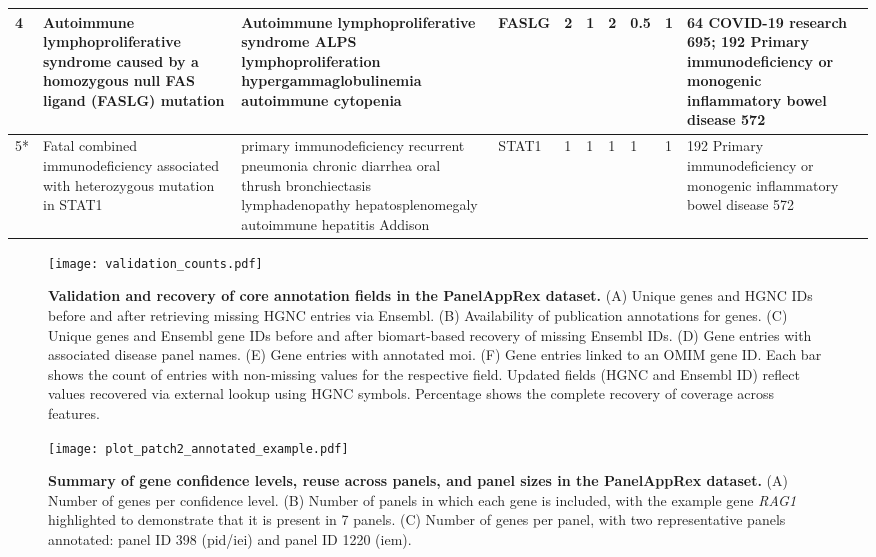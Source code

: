 \begin{table}[htbp]
{\begin{tabular}{|
    p{1cm}|
    p{4cm}|
    p{4cm}|
    p{1.4cm}|
    p{1.3cm}|
    p{1.3cm}|
    p{1.3cm}|
    p{1.3cm}|
    p{1.3cm}|
    p{5cm}|}
\hline																			
4	\cite{magerus-chatinet_autoimmune_2013}	 & 	Autoimmune lymphoproliferative syndrome caused by a homozygous null FAS ligand (FASLG) mutation	 & 	Autoimmune lymphoproliferative syndrome ALPS lymphoproliferation hypergammaglobulinemia autoimmune cytopenia	 & 	FASLG	 & 	2	 & 	1	 & 	2	 & 	0.5	 & 	1	 & 	64 COVID-19 research 695; 192 Primary immunodeficiency or monogenic inflammatory bowel disease 572 \\
\hline																			
5*	\cite{sharfe_fatal_2014}	 & 	Fatal combined immunodeficiency associated with heterozygous mutation in STAT1	 & 	primary immunodeficiency recurrent pneumonia chronic diarrhea oral thrush bronchiectasis lymphadenopathy hepatosplenomegaly autoimmune hepatitis Addison	 & 	STAT1	 & 	1	 & 	1	 & 	1	 & 	1	 & 	1	 & 	192 Primary immunodeficiency or monogenic inflammatory bowel disease 572 \\
\hline
\end{tabular}
}
\end{table}





\begin{figure}[ht]
    \centering
    \texttt{[image: validation\_counts.pdf]}
\caption{\textbf{Validation and recovery of core annotation fields in the PanelAppRex dataset.}
(A) Unique genes and HGNC IDs before and after retrieving missing HGNC entries via Ensembl.
(B) Availability of publication annotations for genes.
(C) Unique genes and Ensembl gene IDs before and after biomart-based recovery of missing Ensembl IDs.
(D) Gene entries with associated disease panel names.
(E) Gene entries with annotated \ac{moi}.
(F) Gene entries linked to an OMIM gene ID.
Each bar shows the count of entries with non-missing values for the respective field. Updated fields (HGNC and Ensembl ID) reflect values recovered via external lookup using HGNC symbols. Percentage shows the complete recovery of coverage across features.
}
    \label{fig:validation}
\end{figure}

\begin{figure}[ht]
    \centering
    \texttt{[image: plot\_patch2\_annotated\_example.pdf]}    
\caption{\textbf{Summary of gene confidence levels, reuse across panels, and panel sizes in the PanelAppRex dataset.}
(A) Number of genes per confidence level. 
(B) Number of panels in which each gene is included, with the example gene \textit{RAG1} highlighted to demonstrate that it is present in 7 panels. 
(C) Number of genes per panel, with two representative panels annotated: panel ID 398 (\ac{pid}/\ac{iei}) and panel ID 1220 (\ac{iem}).
}
    \label{fig:summary_stats}
\end{figure}


